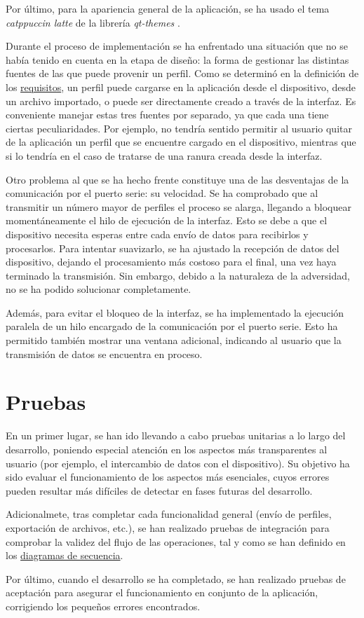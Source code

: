 Por último, para la apariencia general de la aplicación, se ha usado el tema \textit{catppuccin latte} de la librería \textit{qt-themes} \cite{qtthemes-lib}.

Durante el proceso de implementación se ha enfrentado una situación que no se había tenido en cuenta en la etapa de diseño: la forma de gestionar las distintas fuentes de las que puede provenir un perfil. Como se determinó en la definición de los \hyperref[subsub:ui_requisitos]{requisitos}, un perfil puede cargarse en la aplicación desde el dispositivo, desde un archivo importado, o puede ser directamente creado a través de la interfaz. Es conveniente manejar estas tres fuentes por separado, ya que cada una tiene ciertas peculiaridades. Por ejemplo, no tendría sentido permitir al usuario quitar de la aplicación un perfil que se encuentre cargado en el dispositivo, mientras que si lo tendría en el caso de tratarse de una ranura creada desde la interfaz.

Otro problema al que se ha hecho frente constituye una de las desventajas de la comunicación por el puerto serie: su velocidad. Se ha comprobado que al transmitir un número mayor de perfiles el proceso se alarga, llegando a bloquear momentáneamente el hilo de ejecución de la interfaz. Esto se debe a que el dispositivo necesita esperas entre cada envío de datos para recibirlos y procesarlos. Para intentar suavizarlo, se ha ajustado la recepción de datos del dispositivo, dejando el procesamiento más costoso para el final, una vez haya terminado la transmisión. Sin embargo, debido a la naturaleza de la adversidad, no se ha podido solucionar completamente.

Además, para evitar el bloqueo de la interfaz, se ha implementado la ejecución paralela de un hilo encargado de la comunicación por el puerto serie. Esto ha permitido también mostrar una ventana adicional, indicando al usuario que la transmisión de datos se encuentra en proceso.

\section{Pruebas}

En un primer lugar, se han ido llevando a cabo pruebas unitarias a lo largo del desarrollo, poniendo especial atención en los aspectos más transparentes al usuario (por ejemplo, el intercambio de datos con el dispositivo). Su objetivo ha sido evaluar el funcionamiento de los aspectos más esenciales, cuyos errores pueden resultar más difíciles de detectar en fases futuras del desarrollo.

Adicionalmete, tras completar cada funcionalidad general (envío de perfiles, exportación de archivos, etc.), se han realizado pruebas de integración para comprobar la validez del flujo de las operaciones, tal y como se han definido en los \hyperref[fig:ui_recargar]{diagramas de secuencia}.

Por último, cuando el desarrollo se ha completado, se han realizado pruebas de aceptación para asegurar el funcionamiento en conjunto de la aplicación, corrigiendo los pequeños errores encontrados.
